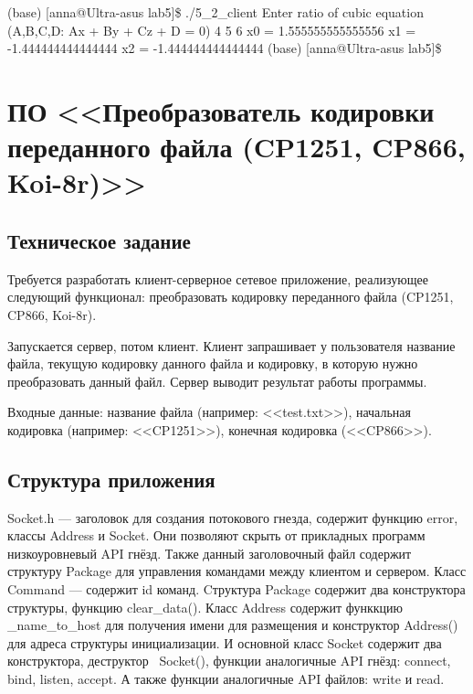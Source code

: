 \documentclass[a4paper,12pt]{extarticle}
\newcommand{\SOFTWARE}{Преобразователь кодировки переданного файла (CP1251, CP866, Koi-8r)}
\begin{document}
(base) [anna@Ultra-asus lab5]\$ ./5\_2\_client \newline
Enter ratio of cubic equation (A,B,C,D: Ax + By + Cz + D = 0)  4 5 6\newline
x0 = 1.555555555555556\newline
x1 = -1.444444444444444\newline
x2 = -1.444444444444444\newline
(base) [anna@Ultra-asus lab5]\$\newline

\newpage

\section{ПО <<\SOFTWARE>>}

\subsection{Техническое задание}
Требуется разработать клиент-серверное сетевое приложение, реализующее следующий функционал: преобразовать кодировку переданного файла (CP1251, CP866, Koi-8r). 

Запускается сервер, потом клиент. Клиент запрашивает у пользователя название файла, текущую кодировку данного файла и кодировку, в которую нужно преобразовать данный файл. Сервер выводит результат работы программы.

Входные данные: название файла (например: <<test.txt>>), начальная кодировка (например: <<CP1251>>), конечная кодировка (<<CP866>>).

\subsection{Структура приложения}
Socket.h --- заголовок для создания потокового гнезда, содержит функцию error, классы Address и Socket. Они позволяют скрыть от прикладных программ низкоуровневый API гнёзд. Также данный заголовочный файл содержит структуру Package для управления командами между клиентом и сервером. Класс Command --- содержит id команд.
Cтруктура Package содержит два конструктора структуры, функцию clear\_data().
Класс Address содержит функкцию \_name\_to\_host для получения имени для размещения и конструктор Address() для адреса структуры инициализации.
И основной класс Socket содержит два конструктора, деструктор ~Socket(), функции аналогичные API гнёзд: connect, bind, listen, accept. А также функции аналогичные API файлов: write и read.
\end{document}

